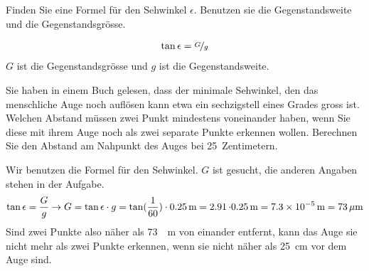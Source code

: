 \documentclass[12pt,a4paper,twoside]{article}
\begin{document}
\begin{aufgabe}
	Finden Sie eine Formel für den Sehwinkel $\epsilon$. Benutzen sie die Gegenstandsweite und die Gegenstandsgrösse.
	\begin{loesung}
		\begin{eqnarray*}
			\tan\epsilon = \nicefrac{G}{g}
		\end{eqnarray*}
		$G$ ist die Gegenstandsgrösse und $g$ ist die Gegenstandsweite.
	\end{loesung}
\end{aufgabe}

\begin{aufgabe}
	\label{zweiPunkte}
	Sie haben in einem Buch gelesen, dass der minimale Sehwinkel, den das menschliche Auge noch auflösen kann etwa ein sechzigstell eines Grades gross ist.
	Welchen Abstand müssen zwei Punkt mindestens voneinander haben, wenn Sie diese mit ihrem Auge noch als zwei separate Punkte erkennen wollen. 
	Berechnen Sie den Abstand am Nahpunkt des Auges bei \SI{25}{Zentimetern}.
	\begin{loesung}
		Wir benutzen die Formel für den Sehwinkel. $G$ ist gesucht, die anderen Angaben stehen in der Aufgabe.
		\begin{eqnarray*}
			\tan\epsilon = \frac{G}{g}\to G=\tan\epsilon\cdot g=\tan(\frac{1}{60})\cdot\SI{0.25}{m}=\SI{2.91}\cdot\SI{0.25}{m}=\SI{7.3E-5}{m}=\SI{73}{\mu m}
		\end{eqnarray*}
		Sind zwei Punkte also näher als \SI{73}{\mu m} von einander entfernt, 
		kann das Auge sie nicht mehr als zwei Punkte erkennen, wenn sie nicht näher als \SI{25}{cm} vor dem Auge sind.
	\end{loesung}
\end{aufgabe}
\end{document}
